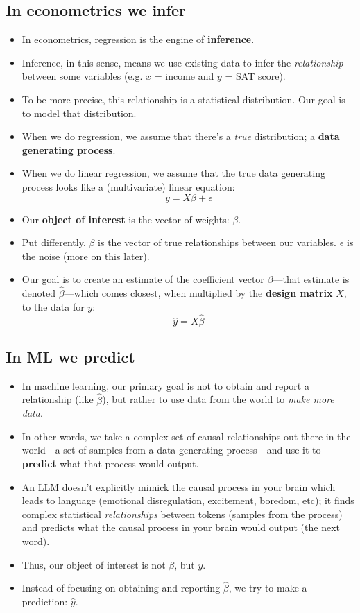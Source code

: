 \documentclass[11pt]{article}
\begin{document}
    \subsection{In econometrics we infer}
        \begin{itemize}
            \item In econometrics, regression is the engine of \textbf{inference}.
            \item Inference, in this sense, means we use existing data to infer the \textit{relationship} between some variables (e.g. $x$ = income and $y$ = SAT score).
            \item To be more precise, this relationship is a statistical distribution. Our goal is to model that distribution. 
            \item When we do regression, we assume that there's a \textit{true} distribution; a \textbf{data generating process}.
            \item When we do linear regression, we assume that the true data generating process looks like a (multivariate) linear equation: \[y = X\beta + \epsilon\]
            \item Our \textbf{object of interest} is the vector of weights: $\beta$.
            \item Put differently, $\beta$ is the vector of true relationships between our variables. $\epsilon$ is the noise (more on this later).
            \item Our goal is to create an estimate of the coefficient vector $\beta$—that estimate is denoted $\hat{\beta}$—which comes closest, when multiplied by the \textbf{design matrix} $X$, to the data for $y$: \[\hat{y} = X\hat{\beta}\]
        \end{itemize} 

    \subsection{In ML we predict}
        \begin{itemize}
            \item In machine learning, our primary goal is not to obtain and report a relationship (like $\hat{\beta}$), but rather to use data from the world to \textit{make more data}.
            \item In other words, we take a complex set of causal relationships out there in the world—a set of samples from a data generating process—and use it to \textbf{predict} what that process would output.
            \item An LLM doesn't explicitly mimick the causal process in your brain which leads to language (emotional disregulation, excitement, boredom, etc); it finds complex statistical \textit{relationships} between tokens (samples from the process) and predicts what the causal process in your brain would output (the next word).
            \item Thus, our object of interest is not $\beta$, but $y$. 
            \item Instead of focusing on obtaining and reporting $\hat{\beta}$, we try to make a prediction: $\hat{y}$.
        \end{itemize}
\end{document}
